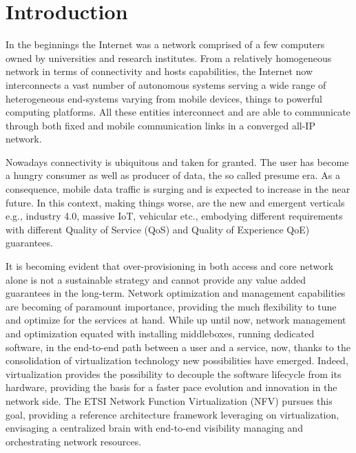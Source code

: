 \chapter{Introduction}
\label{chap:intro}
In the beginnings the Internet was a network comprised of a few computers owned
by universities and research institutes. From a relatively homogeneous network
in terms of connectivity and hosts capabilities, the Internet now interconnects
a vast number of autonomous systems serving a wide range of heterogeneous
end-systems varying from mobile devices, things to powerful computing
platforms. All these entities interconnect and are able to communicate through
both fixed and mobile communication links in a converged all-IP network. 

Nowadays connectivity is ubiquitous and taken for granted. The user has become
a hungry consumer as well as producer of data, the so called presume era. As a
consequence, mobile data traffic is surging and is expected to increase in the
near future. In this context, making things worse, are the new and emergent
verticals e.g., industry 4.0, massive IoT, vehicular etc., embodying different
requirements with different Quality of Service (QoS) and Quality of Experience 
QoE) guarantees. 

It is becoming evident that over-provisioning in both access and core network
alone is not a sustainable strategy and cannot provide any value added
guarantees in the long-term. Network optimization and management capabilities
are becoming of paramount importance, providing the much flexibility to tune
and optimize for the services at hand. While up until now, network management
and optimization equated with installing middleboxes, running dedicated
software, in the end-to-end path between a user and a service, now, thanks to
the consolidation of virtualization technology new possibilities have emerged.
Indeed, virtualization provides the possibility to decouple the software
lifecycle from its hardware, providing the basis for a faster pace evolution
and innovation in the network side. The ETSI Network Function Virtualization 
(NFV) pursues this goal, providing a reference architecture framework leveraging
on virtualization, envisaging a centralized brain with end-to-end visibility
managing and orchestrating network resources.

